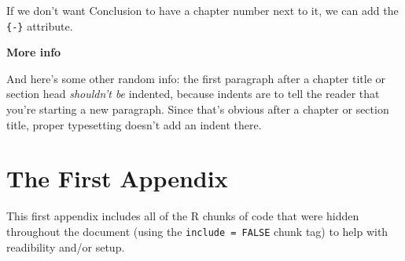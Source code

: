 \documentclass[12pt,twoside]{reedthesis}
\begin{document}
If we don't want Conclusion to have a chapter number next to it, we can add the \texttt{\{-\}} attribute.

\textbf{More info}

And here's some other random info: the first paragraph after a chapter title or section head \emph{shouldn't be} indented, because indents are to tell the reader that you're starting a new paragraph. Since that's obvious after a chapter or section title, proper typesetting doesn't add an indent there.

\appendix

\hypertarget{the-first-appendix}{%
\chapter{The First Appendix}\label{the-first-appendix}}

This first appendix includes all of the R chunks of code that were hidden throughout the document (using the \texttt{include\ =\ FALSE} chunk tag) to help with readibility and/or setup.
\end{document}
